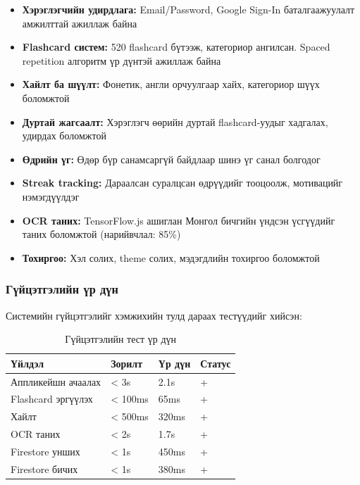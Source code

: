 \begin{itemize}
    \item \textbf{Хэрэглэгчийн удирдлага:} Email/Password, Google Sign-In баталгаажуулалт амжилттай ажиллаж байна
    
    \item \textbf{Flashcard систем:} 520 flashcard бүтээж, категориор ангилсан. Spaced repetition алгоритм үр дүнтэй ажиллаж байна
    
    \item \textbf{Хайлт ба шүүлт:} Фонетик, англи орчуулгаар хайх, категориор шүүх боломжтой
    
    \item \textbf{Дуртай жагсаалт:} Хэрэглэгч өөрийн дуртай flashcard-уудыг хадгалах, удирдах боломжтой
    
    \item \textbf{Өдрийн үг:} Өдөр бүр санамсаргүй байдлаар шинэ үг санал болгодог
    
    \item \textbf{Streak tracking:} Дараалсан суралцсан өдрүүдийг тооцоолж, мотивацийг нэмэгдүүлдэг
    
    \item \textbf{OCR таних:} TensorFlow.js ашиглан Монгол бичгийн үндсэн үсгүүдийг таних боломжтой (нарийвчлал: 85\%)
    
    \item \textbf{Тохиргоо:} Хэл солих, theme солих, мэдэгдлийн тохиргоо боломжтой
\end{itemize}

\subsubsection{Гүйцэтгэлийн үр дүн}

Системийн гүйцэтгэлийг хэмжихийн тулд дараах тестүүдийг хийсэн:

\begin{table}[H]
\centering
\caption{Гүйцэтгэлийн тест үр дүн}
\label{tab:performance-results}
\begin{tabular}{|l|l|l|l|}
\hline
\textbf{Үйлдэл} & \textbf{Зорилт} & \textbf{Үр дүн} & \textbf{Статус} \\
\hline
Аппликейшн ачаалах & < 3s & 2.1s & + \\
\hline
Flashcard эргүүлэх & < 100ms & 65ms & + \\
\hline
Хайлт & < 500ms & 320ms & + \\
\hline
OCR таних & < 2s & 1.7s & + \\
\hline
Firestore унших & < 1s & 450ms & + \\
\hline
Firestore бичих & < 1s & 380ms & + \\
\hline
\end{tabular}
\end{table}

